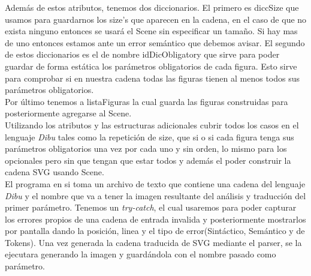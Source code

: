 Además de estos atributos, tenemos dos diccionarios. El primero es diccSize que usamos para guardarnos los size's que
aparecen en la cadena, en el caso de que no exista ninguno entonces se usará el Scene sin especificar un tamaño. Si hay
mas de uno entonces estamos ante un error semántico que debemos avisar. El segundo de estos diccionarios es el de nombre
idDicObligatory que sirve para poder guardar de forma estática los parámetros obligatorios de cada figura. Esto sirve
para comprobar si en nuestra cadena todas las figuras tienen al menos todos sus parámetros obligatorios.\\

Por último tenemos a listaFiguras la cual guarda las figuras construidas para posteriormente agregarse al Scene.\\

Utilizando los atributos y las estructuras adicionales cubrir todos los casos en el lenguaje \textit{Dibu} tales como
la repetición de size, que si o si cada figura tenga sus parámetros obligatorios una vez por cada uno y sin orden, lo
mismo para los opcionales pero sin que tengan que estar todos y además el poder construir la cadena SVG usando Scene.\\

El programa en si toma un archivo de texto que contiene una cadena del lenguaje \textit{Dibu} y el nombre que va a tener
la imagen resultante del análisis y traducción del primer parámetro. Tenemos un \textit{try-catch}, el cual usaremos
para poder capturar los errores propios de una cadena de entrada invalida y posteriormente mostrarlos por pantalla
dando la posición, linea y el tipo de error(Sintáctico, Semántico y de Tokens). Una vez generada la cadena traducida
de SVG mediante el parser, se la ejecutara generando la imagen y guardándola con el nombre pasado como parámetro.

